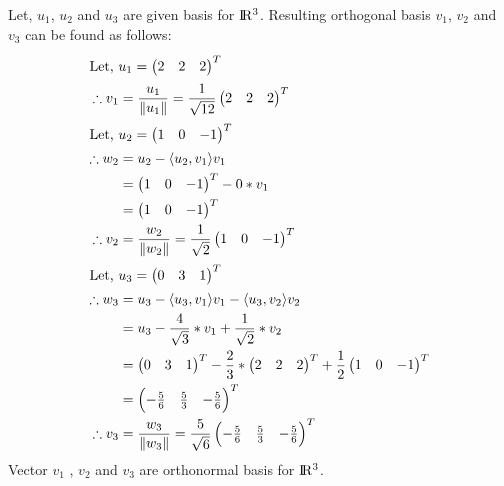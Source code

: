 \documentclass[solution,addpoints,12pt]{exam}
\newenvironment{Solution}{\begin{solution}}{\end{solution}}
\begin{document}
\begin{questions}
\begin{parts}
    \begin{Solution}
    Let, $u_1$, $u_2$ and $u_3$ are given basis for ${\rm I\!R^3}$.
    Resulting orthogonal basis $v_1$, $v_2$ and $v_3$ can be found as follows:
    \begin{align*}
    \intertext{Let, $u_1 = \begin{pmatrix}
    2  &
    2 &
    2
 \end{pmatrix}^T$}
    \therefore v_1 &= \frac{u_1}{\left \| u_1 \right \|}
    = \frac{1}{\sqrt{12}}\begin{pmatrix}
    2  &
    2 &
    2
 \end{pmatrix}^T\\
 \intertext{Let, $u_2 = \begin{pmatrix}
    1  &
    0 &
    -1
 \end{pmatrix}^T$}
 \therefore w_2 &= u_2 - \langle u_2,v_1 \rangle v_1\\
 &= \begin{pmatrix}
    1  &
    0 &
    -1
 \end{pmatrix}^T - 0*v_1\\
 &= \begin{pmatrix}
    1  &
    0 &
    -1
 \end{pmatrix}^T\\
    \therefore v_2 &= \frac{w_2}{\left \| w_2 \right \|}
    = \frac{1}{\sqrt{2}}\begin{pmatrix}
    1  &
    0 &
    -1
 \end{pmatrix}^T\\
 \intertext{Let, $u_3 = \begin{pmatrix}
    0  &
    3 &
    1
 \end{pmatrix}^T$}
 \therefore w_3 &= u_3 - \langle u_3,v_1 \rangle v_1 - \langle u_3,v_2 \rangle v_2\\
 &= u_3 - \frac{4}{\sqrt{3}}*v_1 +\frac{1}{\sqrt{2}}*v_2\\ 
 &= \begin{pmatrix}
    0  &
    3 &
    1
 \end{pmatrix}^T - \frac{2}{3}*\begin{pmatrix}
    2  &
    2 &
    2
 \end{pmatrix}^T + \frac{1}{2}\begin{pmatrix}
    1  &
    0 &
    -1
 \end{pmatrix}^T\\
 &= \begin{pmatrix}
    -\frac{5}{6}  &
    \frac{5}{3} &
    -\frac{5}{6}
 \end{pmatrix}^T\\
 \therefore v_3 &= \frac{w_3}{\left \| w_3 \right \|}
    = \frac{5}{\sqrt{6}}\begin{pmatrix}
    -\frac{5}{6}  &
    \frac{5}{3} &
    -\frac{5}{6}
 \end{pmatrix}^T
    \end{align*}
    Vector $v_1$ , $v_2$ and $v_3$ are orthonormal basis for ${\rm I\!R^3}$.
    \end{Solution}


\end{parts}
\end{questions}
\end{document}

